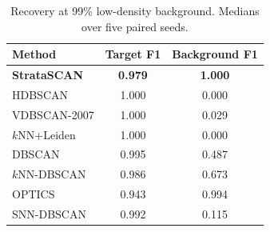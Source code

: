 \begin{table}[t]
\centering
\caption{Recovery at 99\% low-density background. Medians over five paired seeds.}
\label{tab:rare-dense-99}
\setlength{\tabcolsep}{4.5pt}
\begin{tabular}{lcc}
\toprule
Method & Target F1 & Background F1 \\
\midrule
\textbf{StrataSCAN} & \textbf{0.979} & \textbf{1.000} \\
HDBSCAN & 1.000 & 0.000 \\
VDBSCAN-2007 & 1.000 & 0.029 \\
$k$NN+Leiden & 1.000 & 0.000 \\
DBSCAN & 0.995 & 0.487 \\
$k$NN-DBSCAN & 0.986 & 0.673 \\
OPTICS & 0.943 & 0.994 \\
SNN-DBSCAN & 0.992 & 0.115 \\
\bottomrule
\end{tabular}
\end{table}

